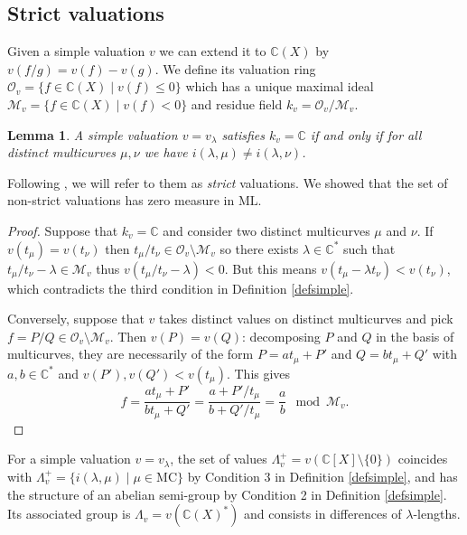 \documentclass{amsart}
\newtheorem{lemma}{Lemma}
\newcommand{\C}{\mathbb{C}}
\newcommand{\ML}{\mathrm{ML}}
\newcommand{\MC}{\mathrm{MC}}
\newcommand{\Mm}{\mathcal{M}}
\newcommand{\Oo}{\mathcal{O}}
\begin{document}
\subsection{Strict valuations}
Given a simple valuation $v$ we can extend it to $\C(X)$ by $v(f/g)=v(f)-v(g)$. We define its valuation ring $\Oo_v=\{f\in \C(X)\mid v(f)\le 0\}$ which has a unique maximal ideal $\mathcal{M}_v=\{f\in \C(X)\mid v(f)<0\}$ and residue field $k_v=\Oo_v/\Mm_v$.

\begin{lemma}\label{strict-residual}
A simple valuation $v=v_\lambda$ satisfies $k_v=\C$ if and only if for all distinct multicurves $\mu,\nu$ we have $i(\lambda,\mu)\ne i(\lambda,\nu)$.
\end{lemma}
Following \cite{MS_Aut(CV)_2020}, we will refer to them as \emph{strict} valuations. We showed that the set of non-strict valuations has zero measure in $\ML$.
\begin{proof}
Suppose that $k_v=\C$ and consider two distinct multicurves $\mu$ and $\nu$. If $v(t_\mu)=v(t_\nu)$ then $t_\mu/t_\nu\in \Oo_v\setminus \Mm_v$ so there exists $\lambda\in \C^*$ such that $t_\mu/t_\nu-\lambda\in \Mm_v$ thus $v(t_\mu/t_\nu-\lambda)<0$. But this means $v(t_\mu-\lambda t_\nu)<v(t_\nu)$, which contradicts the third condition in Definition \ref{defsimple}.

Conversely, suppose that $v$ takes distinct values on distinct multicurves and pick $f=P/Q\in \Oo_v\setminus\Mm_v$. Then $v(P)=v(Q)$: decomposing $P$ and $Q$ in the basis of multicurves, they are necessarily of the form $P=a t_\mu+P'$ and $Q=b t_\mu+Q'$ with $a,b\in \C^*$ and $v(P'), v(Q')<v(t_\mu)$. 
This gives 
$$f=\frac{at_\mu+P'}{bt_\mu+Q'}=\frac{a+P'/t_\mu}{b+Q'/t_\mu}=\frac{a}{b}\mod \Mm_v.$$
\end{proof}

For a simple valuation $v=v_\lambda$, the set of values $\Lambda_v^+ =v(\C[X]\setminus\{0\})$ coincides with $\Lambda^+_v=\{i(\lambda,\mu)\mid \mu \in\MC\}$ by Condition 3 in Definition \ref{defsimple}, and has the structure of an abelian semi-group by Condition 2 in Definition \ref{defsimple}. Its associated group is $\Lambda_v=v(\C(X)^*)$ and consists in differences of $\lambda$-lengths.

\end{document}
